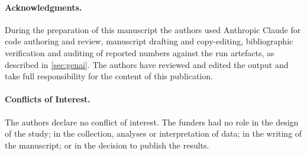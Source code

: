 \paragraph{Acknowledgments.} During the preparation of this manuscript the authors used Anthropic
Claude for code authoring and review, manuscript drafting and copy-editing, bibliographic
verification and auditing of reported numbers against the run artefacts, as described in
\cref{sec:genai}. The authors have reviewed and edited the output and take full responsibility for
the content of this publication.

\paragraph{Conflicts of Interest.} The authors declare no conflict of interest. The funders had no
role in the design of the study; in the collection, analyses or interpretation of data; in the
writing of the manuscript; or in the decision to publish the results.


